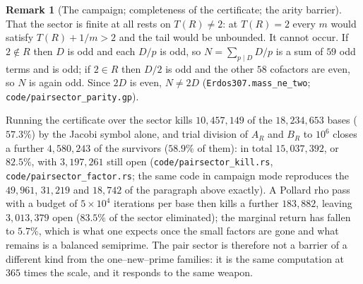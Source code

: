 \documentclass[11pt]{article}
\theoremstyle{definition}
\newtheorem{remark}[theorem]{Remark}
\begin{document}
\begin{remark}[The campaign; completeness of the certificate; the arity barrier]
That the sector is finite at all rests on $T(R)\ne2$: at $T(R)=2$ every $m$ would satisfy
$T(R)+1/m>2$ and the tail would be unbounded. It cannot occur. If $2\notin R$ then $D$ is odd and each
$D/p$ is odd, so $N=\sum_{p\mid D}D/p$ is a sum of $59$ odd terms and is odd; if $2\in R$ then $D/2$
is odd and the other $58$ cofactors are even, so $N$ is again odd. Since $2D$ is even, $N\ne2D$
\textup{(\texttt{Erdos307.mass\_ne\_two}; \texttt{code/pairsector\_parity.gp})}.

Running the certificate over the sector kills $10{,}457{,}149$ of the $18{,}234{,}653$ bases
($57.3\%$) by the Jacobi symbol alone, and trial division of $A_R$ and $B_R$ to $10^6$ closes a
further $4{,}580{,}243$ of the survivors ($58.9\%$ of them): in total $15{,}037{,}392$, or $82.5\%$,
with $3{,}197{,}261$ still open \textup{(\texttt{code/pairsector\_kill.rs}, \texttt{code/pairsector\_factor.rs}; the same
code in campaign mode reproduces the $49{,}961$, $31{,}219$ and $18{,}742$ of the paragraph above
exactly)}. A Pollard rho pass with a budget of $5\times10^4$ iterations per base then kills a further
$183{,}882$, leaving $3{,}013{,}379$ open ($83.5\%$ of the sector eliminated); the marginal return has
fallen to $5.7\%$, which is what one expects once the small factors are gone and what remains is a
balanced semiprime. The pair sector is therefore not a barrier of a different kind from the one--new--prime
families: it is the same computation at $365$ times the scale, and it responds to the same weapon.
\end{remark}
\end{document}
